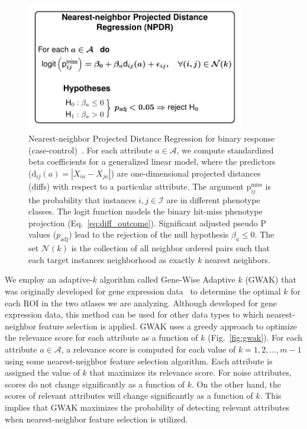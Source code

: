 \documentclass[10pt,letterpaper]{article}\usepackage[]{graphicx}\usepackage[]{color}
\begin{document}
\begin{figure}[h!]
	\centering
	\includegraphics[width=0.85\textwidth]{npdr_finished_diagram.pdf}
	\caption{Nearest-neighbor Projected Distance Regression for binary response (case-control)~\cite{npdr}. For each attribute $a \in \mathcal{A}$, we compute standardized beta coefficients for a generalized linear model, where the predictors ($\text{d}_{ij}(a) = |X_{ia} - X_{ja}|$) are one-dimensional projected distances (diffs) with respect to a particular attribute. The argument $\text{p}^\text{miss}_{ij}$ is the probability that instances $i,j \in \mathcal{I}$ are in different phenotype classes. The logit function models the binary hit-miss phenotype projection (Eq.~\ref{eq:diff_outcome}). Significant adjusted pseudo P values ($p_\text{adj}$) lead to the rejection of the null hypothesis $\beta_a \leq 0$. The set $\mathcal{N}(k)$ is the collection of all neighbor ordered pairs such that each target instances neighborhood as exactly $k$ nearest neighbors.}\label{fig:npdr_finished}
\end{figure}

We employ an adaptive-$k$ algorithm called Gene-Wise Adaptive $k$ (GWAK) that was originally developed for gene expression data~\cite{mckinney13} to determine the optimal $k$ for each ROI in the two atlases we are analyzing. Although developed for gene expression data, this method can be used for other data types to which nearest-neighbor feature selection is applied. GWAK uses a greedy approach to optimize the relevance score for each attribute as a function of $k$ (Fig.~\ref{fig:gwak}). For each attribute $a \in \mathcal{A}$, a relevance score is computed for each value of $k=1,2,\dots,m-1$ using some nearest-neighbor feature selection algorithm. Each attribute is assigned the value of $k$ that maximizes its relevance score. For noise attributes, scores do not change significantly as a function of $k$. On the other hand, the scores of relevant attributes will change significantly as a function of $k$. This implies that GWAK maximizes the probability of detecting relevant attributes when nearest-neighbor feature selection is utilized. 
\end{document}
